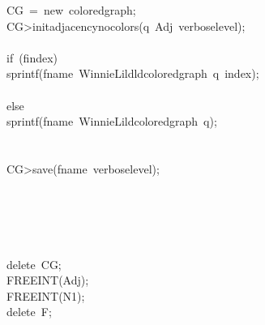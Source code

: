 \begin{tabbing}
\>CG\ =\ new\ coloredgraph;\\[0pt]
\>CG>initadjacencynocolors(q\ Adj\ verboselevel);\\[0pt]
\\[0pt]
\>if\ (findex)\ \\[0pt]
\>\>sprintf(fname\ WinnieLildldcoloredgraph\ q\ index);\\[0pt]
\>\>\\[0pt]
\>else\ \\[0pt]
\>\>sprintf(fname\ WinnieLildcoloredgraph\ q);\\[0pt]
\>\>\\[0pt]
\\[0pt]
\>CG>save(fname\ verboselevel);\\[0pt]
\\[0pt]
\\[0pt]
\\[0pt]
\\[0pt]
\\[0pt]
\>delete\ CG;\\[0pt]
\>FREEINT(Adj);\\[0pt]
\>FREEINT(N1);\\[0pt]
\>delete\ F;\\[0pt]
\\[0pt]
\\[0pt]
\\[0pt]
\\[0pt]
\\[0pt]
\end{tabbing}
